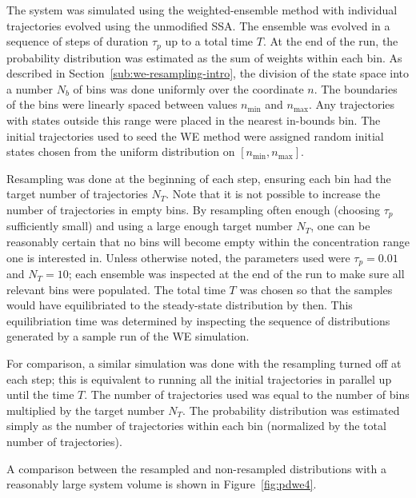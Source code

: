 \documentclass[english,letterpaper,12pt]{report}
\begin{document}
\begin{doublespacing}
The system was simulated using the weighted-ensemble method with individual trajectories evolved using the unmodified SSA. The ensemble was evolved in a sequence of steps of duration $\tau_p$ up to a total time $T$. At the end of the run, the probability distribution was estimated as the sum of weights within each bin. As described in Section~\ref{sub:we-resampling-intro}, the division of the state space into a number $N_b$ of bins was done uniformly over the coordinate $n$. The boundaries of the bins were linearly spaced between values $n_\text{min}$ and $n_\text{max}$. Any trajectories with states outside this range were placed in the nearest in-bounds bin. The initial trajectories used to seed the WE method were assigned random initial states chosen from the uniform distribution on $[n_\text{min}, n_\text{max}]$.

Resampling was done at the beginning of each step, ensuring each bin had the target number of trajectories $N_T$. Note that it is not possible to increase the number of trajectories in empty bins. By resampling often enough (choosing $\tau_p$ sufficiently small) and using a large enough target number $N_T$, one can be reasonably certain that no bins will become empty within the concentration range one is interested in. Unless otherwise noted, the parameters used were $\tau_p = 0.01$ and $N_T = 10$; each ensemble was inspected at the end of the run to make sure all relevant bins were populated. The total time $T$ was chosen so that the samples would have equilibriated to the steady-state distribution by then. This equilibriation time was determined by inspecting the sequence of distributions generated by a sample run of the WE simulation.

For comparison, a similar simulation was done with the resampling turned off at each step; this is equivalent to running all the initial trajectories in parallel up until the time $T$. The number of trajectories used was equal to the number of bins multiplied by the target number $N_T$. The probability distribution was estimated simply as the number of trajectories within each bin (normalized by the total number of trajectories). 

A comparison between the resampled and non-resampled distributions with a reasonably large system volume is shown in Figure~\ref{fig:pdwe4}. 


\end{doublespacing}
\end{document}
